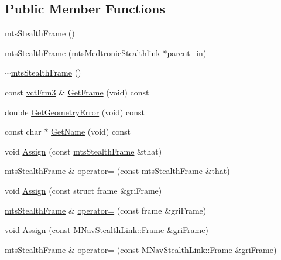 \subsection*{Public Member Functions}
\begin{DoxyCompactItemize}
\item 
\hyperlink{classmts_stealth_frame_af32afe61af4982beef829344c6b96aea}{mts\-Stealth\-Frame} ()
\item 
\hyperlink{classmts_stealth_frame_a40a8a6d5bf9760a5ccc649012b98efc9}{mts\-Stealth\-Frame} (\hyperlink{classmts_medtronic_stealthlink}{mts\-Medtronic\-Stealthlink} $\ast$parent\-\_\-in)
\item 
\hyperlink{classmts_stealth_frame_a2ddd4401f06f843058dbfe2042dc2788}{$\sim$mts\-Stealth\-Frame} ()
\item 
const \hyperlink{vct_transformation_types_8h_a81feda0a02c2d1bc26e5553f409fed20}{vct\-Frm3} \& \hyperlink{classmts_stealth_frame_a9834fbe11a6dc5971a25d3a892620e89}{Get\-Frame} (void) const 
\item 
double \hyperlink{classmts_stealth_frame_a20ebeeaf561c90fb0be2924c02b230e3}{Get\-Geometry\-Error} (void) const 
\item 
const char $\ast$ \hyperlink{classmts_stealth_frame_ab2bdd6399b97c6558824f1feebdba73c}{Get\-Name} (void) const 
\item 
void \hyperlink{classmts_stealth_frame_a1c6b3490139cd399ae5c350cb97f8955}{Assign} (const \hyperlink{classmts_stealth_frame}{mts\-Stealth\-Frame} \&that)
\item 
\hyperlink{classmts_stealth_frame}{mts\-Stealth\-Frame} \& \hyperlink{classmts_stealth_frame_af158556b959ea14edbd87519613df304}{operator=} (const \hyperlink{classmts_stealth_frame}{mts\-Stealth\-Frame} \&that)
\item 
void \hyperlink{classmts_stealth_frame_af72faf583bebe3370e6bbc1436f57573}{Assign} (const struct frame \&gri\-Frame)
\item 
\hyperlink{classmts_stealth_frame}{mts\-Stealth\-Frame} \& \hyperlink{classmts_stealth_frame_a2c6000a1fa5bb27fae3a4f8c51a5312d}{operator=} (const frame \&gri\-Frame)
\item 
void \hyperlink{classmts_stealth_frame_af1699a73f8dfc4704d67edc43b994e7c}{Assign} (const M\-Nav\-Stealth\-Link\-::\-Frame \&gri\-Frame)
\item 
\hyperlink{classmts_stealth_frame}{mts\-Stealth\-Frame} \& \hyperlink{classmts_stealth_frame_aa96c149a0a583ec83a64142410f4c8c6}{operator=} (const M\-Nav\-Stealth\-Link\-::\-Frame \&gri\-Frame)
\item 

\end{DoxyCompactItemize}
